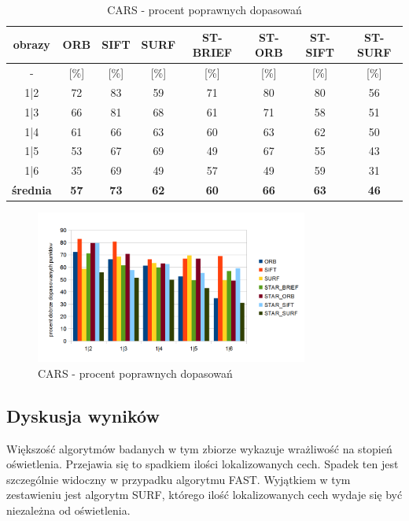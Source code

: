 \begin{table}[htbp]
  \centering
  \caption{CARS - procent poprawnych dopasowań}
    \begin{tabular}{|c|c|c|c|c|c|c|c|}\hline
    obrazy & \textbf{ORB} & \textbf{SIFT} & \textbf{SURF} & \textbf{ST-BRIEF} & \textbf{ST-ORB} & \textbf{ST-SIFT} & \textbf{ST-SURF} \\\hline
     - & [\%] & [\%] & [\%] & [\%] & [\%] & [\%] & [\%] \\\hline
    1|2 & 72 & 83 & 59 & 71 & 80 & 80 & 56 \\
    1|3 & 66 & 81 & 68 & 61 & 71 & 58 & 51 \\
    1|4 & 61 & 66 & 63 & 60 & 63 & 62 & 50 \\
    1|5 & 53 & 67 & 69 & 49 & 67 & 55 & 43 \\
    1|6 & 35 & 69 & 49 & 57 & 49 & 59 & 31 \\\hline
    \textbf{średnia} & \textbf{57} & \textbf{73} & \textbf{62} & \textbf{60} & \textbf{66} & \textbf{63} & \textbf{46} \\\hline
   
    \end{tabular}%
  \label{tab:cars_m2}%
\end{table}%


\begin{figure}
\centering
\includegraphics[width=0.8\textwidth]{pict/mikolajczyk/light/m2.png}
\caption{CARS - procent poprawnych dopasowań}
\label{fig:cars_m2}
\end{figure}


\FloatBarrier
\subsection{Dyskusja wyników}
Większość algorytmów badanych w tym zbiorze wykazuje wrażliwość na stopień oświetlenia. Przejawia się to spadkiem ilości lokalizowanych cech. Spadek ten jest szczególnie widoczny w przypadku algorytmu FAST. Wyjątkiem w tym zestawieniu jest algorytm SURF, którego ilość lokalizowanych cech wydaje się być niezależna od oświetlenia.

